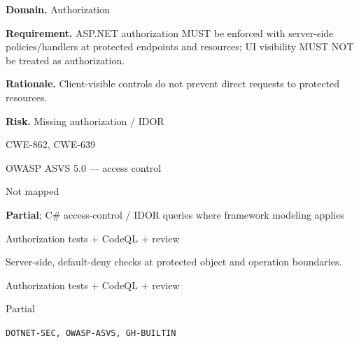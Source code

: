 \documentclass[10pt,letterpaper]{article}
\newcommand{\prioritybadge}[2]{\tcbox[on line,boxrule=0pt,arc=1.2mm,boxsep=0.7mm,left=1mm,right=1mm,top=0.4mm,bottom=0.4mm,colback=#2!12,coltext=#2]{\scriptsize\bfseries #1}}
\begin{document}
\begin{rulebox}[title={\texttt{SCS-CSHARP-AUTHZ-001} \hfill \prioritybadge{Critical Control}{Critical}}]
\textbf{Domain.} Authorization

\textbf{Requirement.} ASP.NET authorization MUST be enforced with server-side policies/handlers at protected endpoints and resources; UI visibility MUST NOT be treated as authorization.

\textbf{Rationale.} Client-visible controls do not prevent direct requests to protected resources.

\textbf{Risk.} Missing authorization / IDOR

\begin{description}[leftmargin=2.65cm,labelwidth=2.3cm,style=nextline,itemsep=1pt,topsep=3pt]
  \item[CWE] CWE-862, CWE-639
  \item[OWASP] OWASP ASVS 5.0 --- access control
  \item[CERT] Not mapped
  \item[CodeQL] \textbf{Partial}; C\# access-control / IDOR queries where framework modeling applies
  \item[Enforcement] Authorization tests + CodeQL + review
  \item[Prevention] Server-side, default-deny checks at protected object and operation boundaries.
  \item[Verification] Authorization tests + CodeQL + review
  \item[Automation] Partial
  \item[Sources] \texttt{DOTNET-SEC, OWASP-ASVS, GH-BUILTIN}
\end{description}
\end{rulebox}
\end{document}
